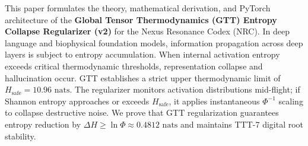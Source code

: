 \begin{abstractbox}
This paper formulates the theory, mathematical derivation, and PyTorch architecture of the \textbf{Global Tensor Thermodynamics (GTT) Entropy Collapse Regularizer (v2)} for the Nexus Resonance Codex (NRC). In deep language and biophysical foundation models, information propagation across deep layers is subject to entropy accumulation. When internal activation entropy exceeds critical thermodynamic thresholds, representation collapse and hallucination occur. GTT establishes a strict upper thermodynamic limit of $H_{\text{safe}} = 10.96\text{ nats}$. The regularizer monitors activation distributions mid-flight; if Shannon entropy approaches or exceeds $H_{\text{safe}}$, it applies instantaneous $\Phi^{-1}$ scaling to collapse destructive noise. We prove that GTT regularization guarantees entropy reduction by $\Delta H \ge \ln \Phi \approx 0.4812\text{ nats}$ and maintains TTT-7 digital root stability.
\end{abstractbox}